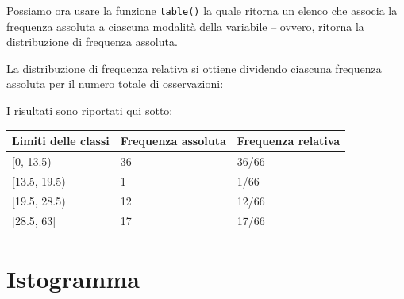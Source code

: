 \documentclass[
  10pt,
  italian,
  a4paper,
  extrafontsizes,onecolumn,openright
  ]{memoir}
\newenvironment{Shaded}{\begin{snugshade}}{\end{snugshade}}
\newcommand{\CommentTok}[1]{\textcolor[rgb]{0.56,0.35,0.01}{\textit{#1}}}
\newcommand{\FunctionTok}[1]{\textcolor[rgb]{0.00,0.00,0.00}{#1}}
\newcommand{\NormalTok}[1]{#1}
\newcommand{\SpecialCharTok}[1]{\textcolor[rgb]{0.00,0.00,0.00}{#1}}
\theoremstyle{definition}
\theoremstyle{definition}
\theoremstyle{definition}
\theoremstyle{definition}
\theoremstyle{remark}
\begin{document}
\noindent
Possiamo ora usare la funzione \texttt{table()} la quale ritorna un elenco che associa la frequenza assoluta a ciascuna modalità della variabile -- ovvero, ritorna la distribuzione di frequenza assoluta.

\begin{Shaded}
\end{Shaded}

\noindent
La distribuzione di frequenza relativa si ottiene dividendo ciascuna frequenza assoluta per il numero totale di osservazioni:

\begin{Shaded}
\end{Shaded}

\noindent
I risultati sono riportati qui sotto:

\begin{longtable}[]{@{}lll@{}}
\toprule
Limiti delle classi & Frequenza assoluta & Frequenza relativa \\
\midrule
\endhead
{[}0, 13.5) & 36 & 36/66 \\
{[}13.5, 19.5) & 1 & 1/66 \\
{[}19.5, 28.5) & 12 & 12/66 \\
{[}28.5, 63{]} & 17 & 17/66 \\
\bottomrule
\end{longtable}

\hypertarget{istogramma}{%
\section{Istogramma}\label{istogramma}}
\end{document}

